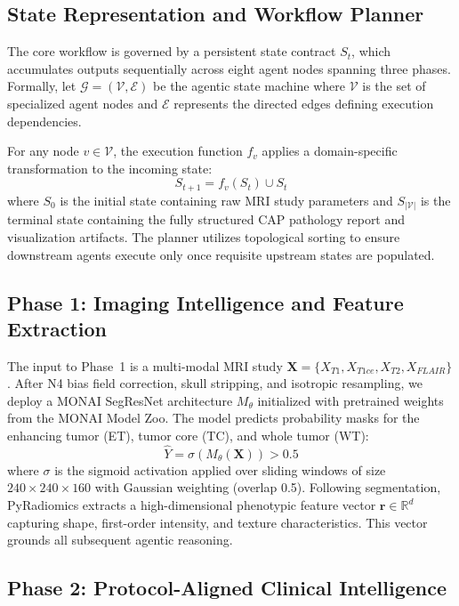 \documentclass[journal]{IEEEtran}
\begin{document}
\subsection{State Representation and Workflow Planner}

The core workflow is governed by a persistent state contract $S_t$, which
accumulates outputs sequentially across eight agent nodes spanning three
phases. Formally, let $\mathcal{G} = (\mathcal{V}, \mathcal{E})$ be the
agentic state machine where $\mathcal{V}$ is the set of specialized agent
nodes and $\mathcal{E}$ represents the directed edges defining execution
dependencies.

For any node $v \in \mathcal{V}$, the execution function $f_v$ applies a
domain-specific transformation to the incoming state:
\begin{equation}
  S_{t+1} = f_v(S_t) \cup S_t
\end{equation}
where $S_0$ is the initial state containing raw MRI study parameters and
$S_{|\mathcal{V}|}$ is the terminal state containing the fully structured
CAP pathology report and visualization artifacts. The planner utilizes
topological sorting to ensure downstream agents execute only once requisite
upstream states are populated.

\subsection{Phase 1: Imaging Intelligence and Feature Extraction}

The input to Phase~1 is a multi-modal MRI study
$\mathbf{X} = \{X_{T1}, X_{T1ce}, X_{T2}, X_{FLAIR}\}$.
After N4 bias field correction, skull stripping, and isotropic resampling,
we deploy a MONAI SegResNet architecture $M_\theta$ initialized with
pretrained weights from the MONAI Model Zoo. The model predicts probability
masks for the enhancing tumor (ET), tumor core (TC), and whole tumor (WT):
\begin{equation}
  \hat{Y} = \sigma(M_\theta(\mathbf{X})) > 0.5
\end{equation}
where $\sigma$ is the sigmoid activation applied over sliding windows of
size $240 \times 240 \times 160$ with Gaussian weighting (overlap 0.5).
Following segmentation, PyRadiomics extracts a high-dimensional phenotypic
feature vector $\mathbf{r} \in \mathbb{R}^d$ capturing shape, first-order
intensity, and texture characteristics. This vector grounds all subsequent
agentic reasoning.

\subsection{Phase 2: Protocol-Aligned Clinical Intelligence}
\end{document}
